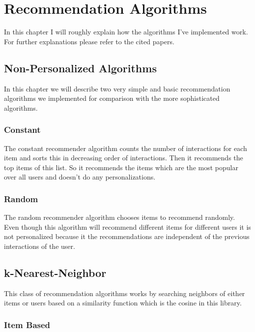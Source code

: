
\chapter{Recommendation Algorithms}
\label{recommendationalgorithms}
In this chapter I will roughly explain how the algorithms I've implemented
work. For further explanations please refer to the cited papers.


\section{Non-Personalized Algorithms}

In this chapter we will describe two very simple and basic recommendation
algorithms we implemented for comparison with the more sophisticated
algorithms.


\subsection{Constant}

The constant recommender algorithm counts the number of interactions
for each item and sorts this in decreasing order of interactions.
Then it recommends the top items of this list. So it recommends the
items which are the most popular over all users and doesn't do any
personalizations.


\subsection{Random}

The random recommender algorithm chooses items to recommend randomly.
Even though this algorithm will recommend different items for different
users it is not personalized because it the recommendations are
independent of the previous interactions of the user.


\section{k-Nearest-Neighbor}

This class of recommendation algorithms works by searching neighbors
of either items or users based on a similarity function which is the
cosine in this library.


\subsection{Item Based}
\label{itembasedknn}

